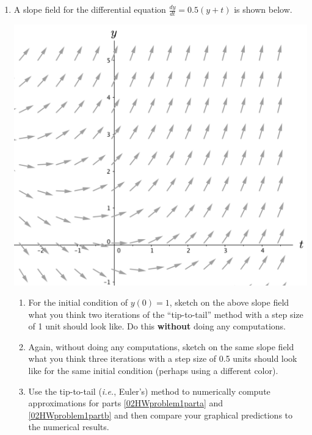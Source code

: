 \clearpage
 \begin{enumerate}

\item A slope field for the differential equation $\displaystyle\frac{dy}{dt}=0.5(y+t)$ is shown below. \label{02HWproblem1}
\begin{center}
\includegraphics[width=6in]{02/02HWSlopeField1.png}
\end{center}
\begin{enumerate}
\item	For the initial condition of $y(0) = 1$, sketch on the above slope field what you think two iterations of the ``tip-to-tail'' method with a step size of 1 unit should look like. Do this \textbf{without} doing any computations. \label{02HWproblem1parta}
\item	Again, without doing any computations, sketch on the same slope field what you think three iterations with a step size of 0.5 units should look like for the same initial condition (perhaps using a different color). \label{02HWproblem1partb}
\item	Use the tip-to-tail ({\em i.e.}, Euler's) method to numerically compute approximations for parts \ref{02HWproblem1parta} and \ref{02HWproblem1partb} and then compare your graphical predictions to the numerical results. \label{02HWproblem1partc}
\end{enumerate}


\end{enumerate}
